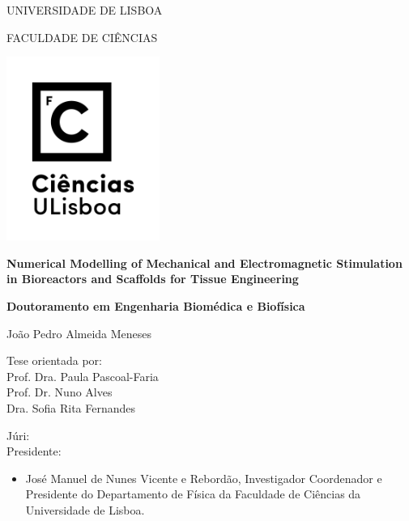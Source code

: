 \documentclass[12pt]{report}
\begin{document}
\begin{titlepage}
\thispagestyle{empty}
\centering
{\fontsize{12}{14}\selectfont UNIVERSIDADE DE LISBOA\\}
{\fontsize{12}{14}\selectfont FACULDADE DE CIÊNCIAS\par}
\vspace{1em}
\includegraphics[width=5cm]{./figures/FCULogoB.png}\par
\vspace{1em}
{\fontsize{12}{12} \selectfont \textbf{Numerical Modelling of Mechanical and Electromagnetic Stimulation in Bioreactors and Scaffolds for Tissue Engineering}\par}
\vspace{1.5em}
{\fontsize{12}{12}\selectfont \textbf{Doutoramento em Engenharia Biomédica e Biofísica} \par}
\vspace{1.5em}
{\fontsize{12}{12}\selectfont João Pedro Almeida Meneses\\}
\vspace{1em}
{\fontsize{12}{13}\selectfont Tese orientada por:\\Prof. Dra. Paula Pascoal-Faria\\Prof. Dr. Nuno Alves\\ Dra. Sofia Rita Fernandes\par}
\vspace{1em}
{\fontsize{10}{10}\selectfont
\raggedright
Júri: \\
Presidente:
\begin{itemize}
\setlength{\itemsep}{1pt}
\setlength{\parskip}{0pt}
\setlength{\parsep}{0pt}
\item José Manuel de Nunes Vicente e Rebordão, Investigador Coordenador e Presidente do Departamento de Física da Faculdade de Ciências da Universidade de Lisboa.
\end{itemize}
}
\end{titlepage}
\end{document}
